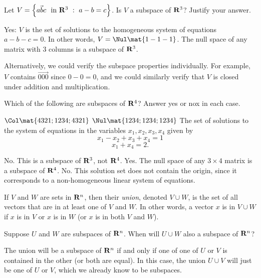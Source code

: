 \begin{problems}
\problem Let
$V = \left\{ \vec{a b c} \ \textup{ in } {\bf R}^3 \ : \ a-b = c\right\}$.  Is
$V$ a subspace of ${\bf R}^3$?  Justify your answer.

\begin{solution}
  Yes: $V$ is the set of solutions to the homogeneous system of equations
  $a-b-c = 0$.  In other words, $V = \Nul\mat{1 -1 -1}$.  The null space
  of any matrix with $3$ columns is a subspace of ${\bf R}^3$.

  Alternatively, we could verify the subspace properties individually.
  For example, $V$ contains $\vec{0 0 0}$ since $0 - 0 = 0$, and we
  could similarly verify that $V$ is closed under addition and
  multiplication.
\end{solution}


\problem %
Which of the following are subspaces of ${\bf R}^4$?  Answer yes or nox
in each case.
\begin{subproblems}
  \subproblem $\Col\mat{4 3 2 1; 1 2 3 4; 4 3 2 1}$ %
  \subproblem $\Nul\mat{1 2 3 4; 1 2 3 4; 1 2 3 4}$ %
  \subproblem The set of solutions to the system of equations in the
  variables $x_1, x_2, x_3, x_4$ given by
  \[x_1 - x_2 + x_3 + x_4 = 1\]
  \[x_1 + x_4 = 2.\]
\end{subproblems}
\begin{solution}
\begin{subproblems}
  \subproblem No.  This is a subspace of ${\bf R}^3$, not ${\bf R}^4$.
  \subproblem Yes.  The null space of any $3 \times 4$ matrix is a
  subspace of ${\bf R}^4$. %
  \subproblem No.  This solution set does not contain the origin,
  since it corresponds to a non-homogeneous linear system of
  equations.
\end{subproblems}
\end{solution}

\problem If $V$ and $W$ are sets in ${\bf R}^n$, then their \textit{union},
denoted $V \cup W$, is the set of all vectors that are in at least one of $V$
and $W$.  In other words, a vector $x$ is in $V \cup W$ if $x$ is in $V$ or $x$
is in $W$ (or $x$ is in both $V$ and $W$).

Suppose $U$ and $W$ are subspaces of ${\bf R}^n$.  When will $U \cup W$ also a
subspace of ${\bf R}^n$?

\begin{solution}
  The union will be a subspace of ${\bf R}^n$ if and only if one of one of $U$
  or $V$ is contained in the other (or both are equal).  In this case, the union
  $U \cup V$ will just be one of $U$ or $V$, which we already know to be
  subspaces.


\end{solution}
\end{problems}
